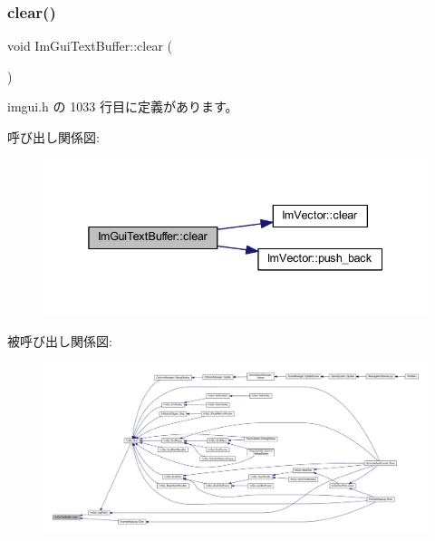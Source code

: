 \mbox{\label{struct_im_gui_text_buffer_a9e4edc9f950bc9e35d5c3b3071dbc0df}} 
\subsubsection{\texorpdfstring{clear()}{clear()}}
{\footnotesize\ttfamily void Im\+Gui\+Text\+Buffer\+::clear (\begin{DoxyParamCaption}{ }\end{DoxyParamCaption})\hspace{0.3cm}{\ttfamily [inline]}}



 imgui.\+h の 1033 行目に定義があります。

呼び出し関係図\+:\nopagebreak
\begin{figure}[H]
\begin{center}
\leavevmode
\includegraphics[width=338pt]{struct_im_gui_text_buffer_a9e4edc9f950bc9e35d5c3b3071dbc0df_cgraph}
\end{center}
\end{figure}
被呼び出し関係図\+:
\nopagebreak
\begin{figure}[H]
\begin{center}
\leavevmode
\includegraphics[width=350pt]{struct_im_gui_text_buffer_a9e4edc9f950bc9e35d5c3b3071dbc0df_icgraph}
\end{center}
\end{figure}
\mbox{\label{struct_im_gui_text_buffer_afdef38ae725bb5495f0143170fa902c8}} 
